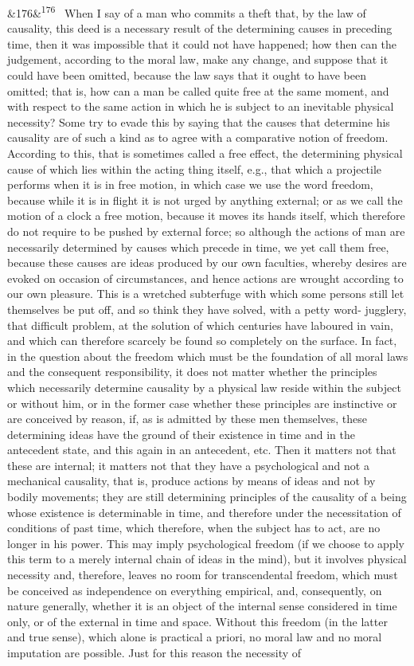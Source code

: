 \documentclass[12pt]{article}
\newcommand{\para}[1][]{\par\noindent\ifx&#1&\else\textsuperscript{\footnotesize #1}~\fi}
\begin{document}
\para[176] When I say of a man who commits a theft that, by the law of causality, this deed is a necessary result of the determining causes in preceding time, then it was impossible that it could not have happened; how then can the judgement, according to the moral law, make any change, and suppose that it could have been omitted, because the law says that it ought to have been omitted; that is, how can a man be called quite free at the same moment, and with respect to the same action in which he is subject to an inevitable physical necessity? Some try to evade this by saying that the causes that determine his causality are of such a kind as to agree with a comparative notion of freedom. According to this, that is sometimes called a free effect, the determining physical cause of which lies within the acting thing itself, e.g., that which a projectile performs when it is in free motion, in which case we use the word freedom, because while it is in flight it is not urged by anything external; or as we call the motion of a clock a free motion, because it moves its hands itself, which therefore do not require to be pushed by external force; so although the actions of man are necessarily determined by causes which precede in time, we yet call them free, because these causes are ideas produced by our own faculties, whereby desires are evoked on occasion of circumstances, and hence actions are wrought according to our own pleasure. This is a wretched subterfuge with which some persons still let themselves be put off, and so think they have solved, with a petty word- jugglery, that difficult problem, at the solution of which centuries have laboured in vain, and which can therefore scarcely be found so completely on the surface. In fact, in the question about the freedom which must be the foundation of all moral laws and the consequent responsibility, it does not matter whether the principles which necessarily determine causality by a physical law reside within the subject or without him, or in the former case whether these principles are instinctive or are conceived by reason, if, as is admitted by these men themselves, these determining ideas have the ground of their existence in time and in the antecedent state, and this again in an antecedent, etc. Then it matters not that these are internal; it matters not that they have a psychological and not a mechanical causality, that is, produce actions by means of ideas and not by bodily movements; they are still determining principles of the causality of a being whose existence is determinable in time, and therefore under the necessitation of conditions of past time, which therefore, when the subject has to act, are no longer in his power. This may imply psychological freedom (if we choose to apply this term to a merely internal chain of ideas in the mind), but it involves physical necessity and, therefore, leaves no room for transcendental freedom, which must be conceived as independence on everything empirical, and, consequently, on nature generally, whether it is an object of the internal sense considered in time only, or of the external in time and space. Without this freedom (in the latter and true sense), which alone is practical a priori, no moral law and no moral imputation are possible. Just for this reason the necessity of 
\end{document}
